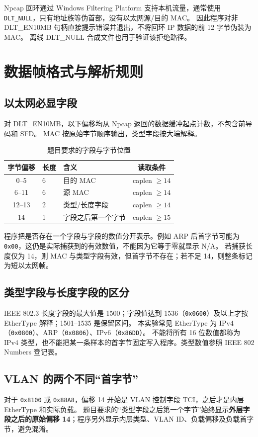 \documentclass[UTF8,notitlepage,11pt]{ctexart}
\newcommand{\src}[1]{\nolinkurl{#1}}
\begin{document}
Npcap 回环通过 Windows Filtering Platform 支持本机流量，通常使用 \src{DLT_NULL}，只有地址族等伪首部，没有以太网源/目的 MAC\cite{npcapdev}。
因此程序对非 DLT\_EN10MB 句柄直接提示错误并退出，不将回环 IP 数据的前 12 字节伪装为 MAC。
离线 DLT\_NULL 合成文件也用于验证该拒绝路径。

\section{数据帧格式与解析规则}\label{sec:frame}
\subsection{以太网必显字段}
对 DLT\_EN10MB，以下偏移均从 Npcap 返回的数据缓冲起点计数，不包含前导码和 SFD。
MAC 按原始字节顺序输出，类型字段按大端解释。

\begin{table}[H]\centering
\caption{题目要求的字段与字节位置}
\begin{tabular}{cllc}\toprule
字节偏移 & 长度 & 含义 & 读取条件\\\midrule
0--5 & 6 & 目的 MAC & caplen $\ge 14$\\
6--11 & 6 & 源 MAC & caplen $\ge 14$\\
12--13 & 2 & 类型/长度字段 & caplen $\ge 14$\\
14 & 1 & 字段之后第一个字节 & caplen $\ge 15$\\\bottomrule
\end{tabular}\end{table}

程序把是否存在一个字段与字段的数值分开表示。例如 ARP 后首字节可能为 \src{0x00}，这仍是实际捕获到的有效数值，不能因为它等于零就显示 N/A。
若捕获长度仅为 14，则 MAC 与类型字段有效，但首字节不存在；若不足 14，则整条标记为短以太网帧。

\subsection{类型字段与长度字段的区分}
IEEE 802.3 长度字段的最大值是 1500；字段值达到 1536（\src{0x0600}）及以上才按 EtherType 解释；1501--1535 是保留区间。
本实验常见 EtherType 为 IPv4（\src{0x0800}）、ARP（\src{0x0806}）、IPv6（\src{0x86DD}）。
不能将所有 16 位数值都称为 IPv4 类型，也不能把某一条样本的首字节固定写入程序。类型数值参照 IEEE 802 Numbers 登记表\cite{ethertypes}。

\subsection{VLAN 的两个不同“首字节”}
对于 \src{0x8100} 或 \src{0x88A8}，偏移 14 开始是 VLAN 控制字段 TCI，之后才是内层 EtherType 和实际负载。
题目要求的“类型字段之后第一个字节”始终显示\textbf{外层字段之后的原始偏移 14}；程序另外显示内层类型、VLAN ID、负载偏移及负载首字节，避免混淆。
\end{document}
